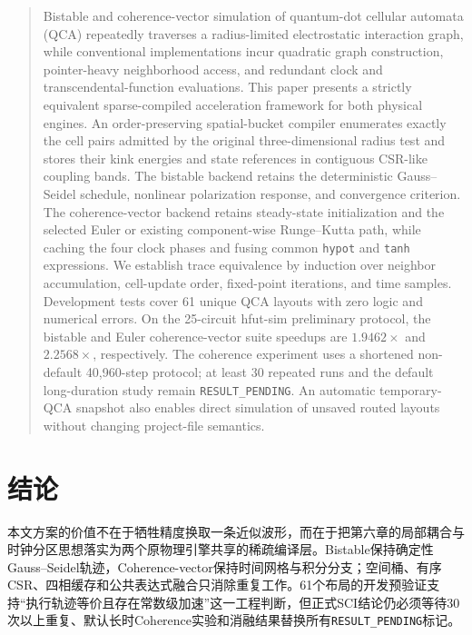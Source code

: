 \documentclass[UTF8,a4paper,11pt]{ctexart}
\newcommand{\pending}{\texttt{RESULT\_PENDING}}
\newcommand{\csr}{\textsc{CSR}}
\begin{document}
\begin{quote}\small
Bistable and coherence-vector simulation of quantum-dot cellular automata (QCA) repeatedly traverses a radius-limited electrostatic interaction graph, while conventional implementations incur quadratic graph construction, pointer-heavy neighborhood access, and redundant clock and transcendental-function evaluations. This paper presents a strictly equivalent sparse-compiled acceleration framework for both physical engines. An order-preserving spatial-bucket compiler enumerates exactly the cell pairs admitted by the original three-dimensional radius test and stores their kink energies and state references in contiguous CSR-like coupling bands. The bistable backend retains the deterministic Gauss--Seidel schedule, nonlinear polarization response, and convergence criterion. The coherence-vector backend retains steady-state initialization and the selected Euler or existing component-wise Runge--Kutta path, while caching the four clock phases and fusing common \texttt{hypot} and \texttt{tanh} expressions. We establish trace equivalence by induction over neighbor accumulation, cell-update order, fixed-point iterations, and time samples. Development tests cover 61 unique QCA layouts with zero logic and numerical errors. On the 25-circuit hfut-sim preliminary protocol, the bistable and Euler coherence-vector suite speedups are $1.9462\times$ and $2.2568\times$, respectively. The coherence experiment uses a shortened non-default 40,960-step protocol; at least 30 repeated runs and the default long-duration study remain \texttt{RESULT\_PENDING}. An automatic temporary-QCA snapshot also enables direct simulation of unsaved routed layouts without changing project-file semantics.
\end{quote}

\section{结论}

本文方案的价值不在于牺牲精度换取一条近似波形，而在于把第六章的局部耦合与时钟分区思想落实为两个原物理引擎共享的稀疏编译层。Bistable保持确定性Gauss--Seidel轨迹，Coherence-\allowbreak vector保持时间网格与积分分支；空间桶、有序\csr{}、四相缓存和公共表达式融合只消除重复工作。61个布局的开发预验证支持“执行轨迹等价且存在常数级加速”这一工程判断，但正式SCI结论仍必须等待30次以上重复、默认长时Coherence实验和消融结果替换所有\pending{}标记。
\end{document}
